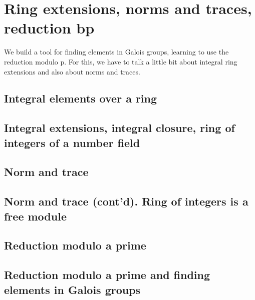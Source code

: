 \chapter{Ring extensions, norms and traces, reduction bp}
We build a tool for finding elements in Galois groups, learning to use
the reduction modulo p. For this, we have to talk a little bit about
integral ring extensions and also about norms and traces.


\section{Integral elements over a ring}
\section{Integral extensions, integral closure, ring of integers of a number field}
\section{Norm and trace}
\section{Norm and trace (cont'd). Ring of integers is a free module}
\section{Reduction modulo a prime}
\section{Reduction modulo a prime and finding elements in Galois groups}
